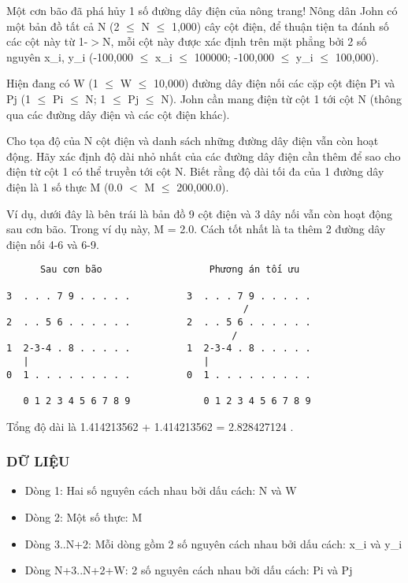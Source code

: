 



   Một cơn bão đã phá hủy 1 số đường dây điện của nông trang! Nông dân  John có một bản đồ tất cả N (2  $\le$  N  $\le$  1,000) cây cột điện, để thuận tiện ta đánh số các cột này từ 1-$>$N, mỗi cột này được xác định  trên mặt phẳng bởi 2 số nguyên x\_i,  y\_i (-100,000  $\le$  x\_i  $\le$  100000; -100,000  $\le$  y\_i  $\le$  100,000).  

   Hiện đang có W (1  $\le$  W  $\le$  10,000) đường dây điện nối các cặp cột điện  Pi và Pj (1  $\le$  Pi  $\le$  N; 1  $\le$  Pj  $\le$  N).  John cần mang điện từ cột 1 tới cột N (thông qua các đường dây điện và  các cột điện khác).  

   Cho tọa độ của N cột điện và danh sách những đường dây điện vẫn còn hoạt  động. Hãy xác định độ dài nhỏ nhất của các đường dây điện cần thêm để sao  cho điện từ cột 1 có thể truyền tới cột N. Biết rằng độ dài tối đa của  1 đường dây điện là 1 số thực M (0.0 $<$ M  $\le$  200,000.0).  

   Ví dụ, dưới đây là bên trái là bản đồ 9 cột điện và 3 dây nối vẫn còn hoạt động sau cơn bão. Trong ví dụ này, M = 2.0. Cách tốt nhất là ta thêm 2 đường dây điện nối 4-6 và 6-9.  
\begin{verbatim}
      Sau cơn bão                   Phương án tối ưu

3  . . . 7 9 . . . . .          3  . . . 7 9 . . . . .
                                          /
2  . . 5 6 . . . . . .          2  . . 5 6 . . . . . .
                                        /
1  2-3-4 . 8 . . . . .          1  2-3-4 . 8 . . . . .
   |                               |
0  1 . . . . . . . . .          0  1 . . . . . . . . .

   0 1 2 3 4 5 6 7 8 9             0 1 2 3 4 5 6 7 8 9
\end{verbatim}

   Tổng độ dài là 1.414213562 + 1.414213562 = 2.828427124 .  

\subsubsection{   DỮ LIỆU  }
\begin{itemize}
	\item     Dòng 1: Hai số nguyên cách nhau bởi dấu cách: N và W   
	\item     Dòng 2: Một số thực: M   
	\item     Dòng 3..N+2: Mỗi dòng gồm 2 số nguyên cách nhau bởi dấu cách: x\_i         và y\_i   
	\item     Dòng N+3..N+2+W: 2 số nguyên cách nhau bởi dấu cách: Pi và Pj   
\end{itemize}

